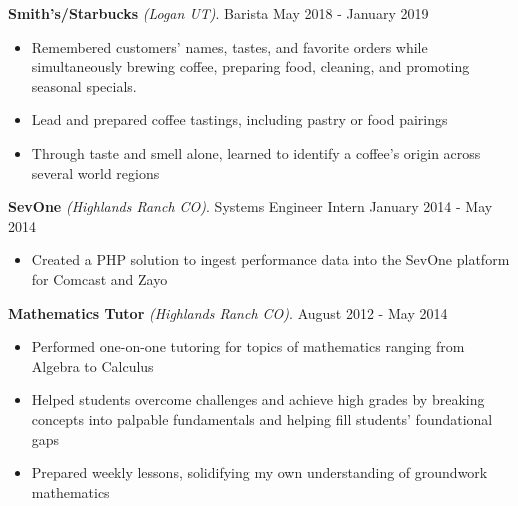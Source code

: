 \documentclass[letterpaper,11pt]{article}
\begin{document}
\clearpage
\textbf{Smith's/Starbucks} \textit{(Logan UT)}. Barista \hfill May 2018 - January 2019
\begin{itemize}[noitemsep,topsep=0pt]
	\item Remembered customers' names, tastes, and favorite orders while simultaneously brewing coffee, preparing food, cleaning, and promoting seasonal specials.
	\item Lead and prepared coffee tastings, including pastry or food pairings
	\item Through taste and smell alone, learned to identify a coffee's origin across several world regions\\

\end{itemize}

\textbf{SevOne} \textit{(Highlands Ranch CO)}. Systems Engineer Intern \hfill January 2014 - May 2014
\begin{itemize}[noitemsep,topsep=0pt]
	\item Created a PHP solution to ingest performance data into the SevOne platform for Comcast and Zayo\\
\end{itemize}

\textbf{Mathematics Tutor} \textit{(Highlands Ranch CO)}. \hfill August 2012 - May 2014
\begin{itemize}[noitemsep,topsep=0pt]
	\item Performed one-on-one tutoring for topics of mathematics ranging from Algebra to Calculus
	\item Helped students overcome challenges and achieve high grades by breaking concepts into palpable fundamentals and helping fill students' foundational gaps
	\item Prepared weekly lessons, solidifying my own understanding of groundwork mathematics\\
\end{itemize}

\end{document}
